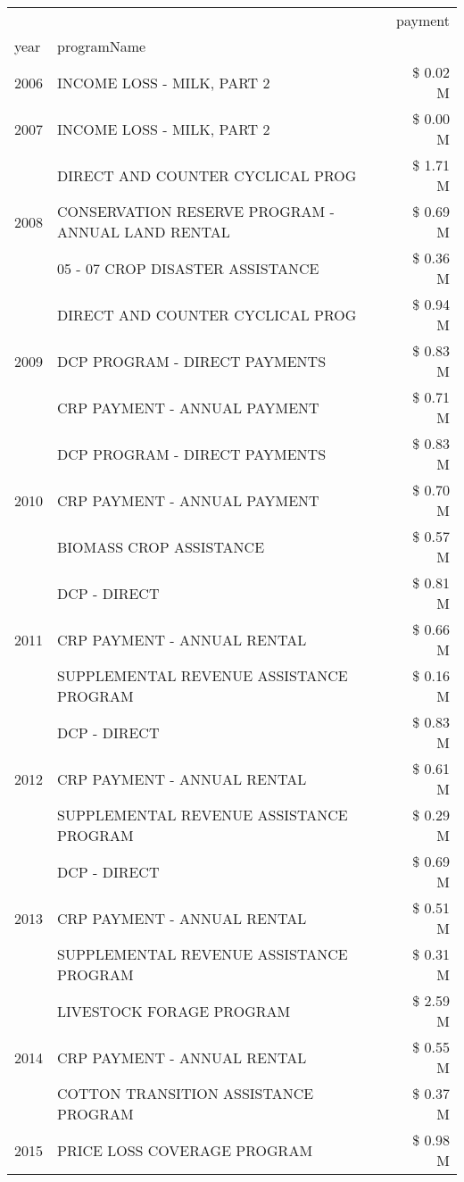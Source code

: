 \begin{tabular}{llr}
\toprule
 &  & payment \\
year & programName &  \\
\midrule
2006 & INCOME LOSS - MILK, PART 2 & \$ 0.02 M \\
\cline{1-3}
2007 & INCOME LOSS - MILK, PART 2 & \$ 0.00 M \\
\cline{1-3}
\multirow[t]{3}{*}{2008} & DIRECT AND COUNTER CYCLICAL PROG & \$ 1.71 M \\
 & CONSERVATION RESERVE PROGRAM - ANNUAL LAND RENTAL & \$ 0.69 M \\
 & 05 - 07 CROP DISASTER ASSISTANCE & \$ 0.36 M \\
\cline{1-3}
\multirow[t]{3}{*}{2009} & DIRECT AND COUNTER CYCLICAL PROG & \$ 0.94 M \\
 & DCP PROGRAM - DIRECT PAYMENTS & \$ 0.83 M \\
 & CRP PAYMENT - ANNUAL PAYMENT & \$ 0.71 M \\
\cline{1-3}
\multirow[t]{3}{*}{2010} & DCP PROGRAM - DIRECT PAYMENTS & \$ 0.83 M \\
 & CRP PAYMENT - ANNUAL PAYMENT & \$ 0.70 M \\
 & BIOMASS CROP ASSISTANCE & \$ 0.57 M \\
\cline{1-3}
\multirow[t]{3}{*}{2011} & DCP - DIRECT & \$ 0.81 M \\
 & CRP PAYMENT - ANNUAL RENTAL & \$ 0.66 M \\
 & SUPPLEMENTAL REVENUE ASSISTANCE PROGRAM & \$ 0.16 M \\
\cline{1-3}
\multirow[t]{3}{*}{2012} & DCP - DIRECT & \$ 0.83 M \\
 & CRP PAYMENT - ANNUAL RENTAL & \$ 0.61 M \\
 & SUPPLEMENTAL REVENUE ASSISTANCE PROGRAM & \$ 0.29 M \\
\cline{1-3}
\multirow[t]{3}{*}{2013} & DCP - DIRECT & \$ 0.69 M \\
 & CRP PAYMENT - ANNUAL RENTAL & \$ 0.51 M \\
 & SUPPLEMENTAL REVENUE ASSISTANCE PROGRAM & \$ 0.31 M \\
\cline{1-3}
\multirow[t]{3}{*}{2014} & LIVESTOCK FORAGE PROGRAM & \$ 2.59 M \\
 & CRP PAYMENT - ANNUAL RENTAL & \$ 0.55 M \\
 & COTTON TRANSITION ASSISTANCE PROGRAM & \$ 0.37 M \\
\cline{1-3}
\multirow[t]{3}{*}{2015} & PRICE LOSS COVERAGE PROGRAM & \$ 0.98 M \\

\end{tabular}
